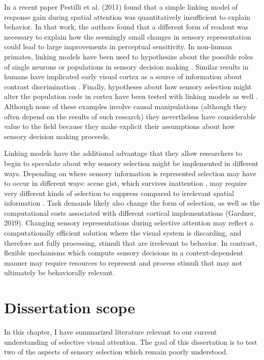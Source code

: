 In a recent paper Pestilli et al. (2011) found that a simple linking model of response gain during spatial attention was quantitatively insufficient to explain behavior. In that work, the authors found that a different form of readout was necessary to explain how the seemingly small changes in sensory representation could lead to large improvements in perceptual sensitivity. In non-human primates, linking models have been used to hypothesize about the possible roles of single neurons or populations in sensory decision making \citep{Newsome1989-fr}. Similar results in humans have implicated early visual cortex as a source of information about contrast discrimination \citep{Boynton1999-jd}. Finally, hypotheses about how sensory selection might alter the population code in cortex have been tested with linking models as well \citep{Cohen2011-pa}. Although none of these examples involve causal manipulations (although they often depend on the results of such research) they nevertheless have considerable value to the field because they make explicit their assumptions about how sensory decision making proceeds.

Linking models have the additional advantage that they allow researchers to begin to speculate about why sensory selection might be implemented in different ways. Depending on where sensory information is represented selection may have to occur in different ways: scene gist, which survives inattention \citep{Li2002-ji,Peelen2009-us}, may require very different kinds of selection to suppress compared to irrelevant spatial information \citep{Pestilli2011-gi}. Task demands likely also change the form of selection, as well as the computational costs associated with different cortical implementations (Gardner, 2019). Changing sensory representations during selective attention may reflect a computationally efficient solution where the visual system is discarding, and therefore not fully processing, stimuli that are irrelevant to behavior. In contrast, flexible mechanisms which compute sensory decisions in a context-dependent manner \citep{Mante2013-tn} may require resources to represent and process stimuli that may not ultimately be behaviorally relevant. 

\section{Dissertation scope}

In this chapter, I have summarized literature relevant to our current understanding of selective visual attention. The goal of this dissertation is to test two of the aspects of sensory selection which remain poorly understood.

